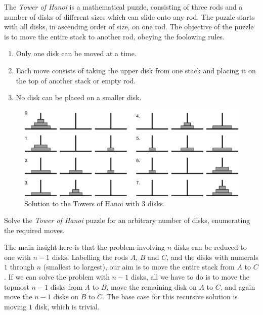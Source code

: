 

\problem The \textit{Tower of Hanoi} is a mathematical puzzle, consisting of three rods and a number of disks of different sizes which
can slide onto any rod. The puzzle starts with all disks, in ascending order of size, on one rod. The objective of the puzzle is to
move the entire stack to another rod, obeying the foolowing rules.
\begin{enumerate}
	\item Only one disk can be moved at a time.
	\item Each move consists of taking the upper disk from one stack and placing it on the top of another stack or empty rod.
	\item No disk can be placed on a smaller disk.
\end{enumerate}

\begin{figure}[h]
	\begin{center}
		\includegraphics[scale=0.7]{hanoi.png}
	\end{center}
	\caption*{Solution to the Towers of Hanoi with 3 disks.}
	\label{fig:hanoi_solved}
\end{figure}

Solve the \textit{Tower of Hanoi} puzzle for an arbitrary number of disks, enumerating the required moves.

\solution The main insight here is that the problem involving $n$ disks can be reduced to one with $n - 1$ disks.
Labelling the rods $A$, $B$ and $C$, and the disks with numerals $1$ through $n$ (smallest to largest), our aim is to move the
entire stack from $A$ to $C$. If we can solve the problem with $n - 1$ disks, all we have to do is to move the topmost $n - 1$ disks
from $A$ to $B$, move the remaining disk on $A$ to $C$, and again move the $n - 1$ disks on $B$ to $C$. The base case for this
recursive solution is moving $1$ disk, which is trivial.

